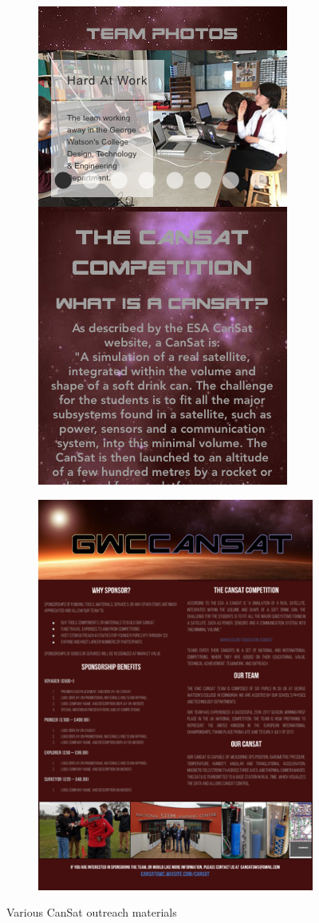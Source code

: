 \documentclass[]{report}
\begin{document}
	\begin{figure}
		\centering
		\begin{subfigure}{.5\textwidth}
			\centering
			\includegraphics[width=.6\linewidth]{website.png}
		\end{subfigure}%
		\begin{subfigure}{.5\textwidth}
			\centering
			\includegraphics[width=0.8\linewidth, angle=0]{brochure.png}
		\end{subfigure}
		\caption{Various CanSat outreach materials}
		\label{smedia}
	\end{figure}
	
\end{document}

